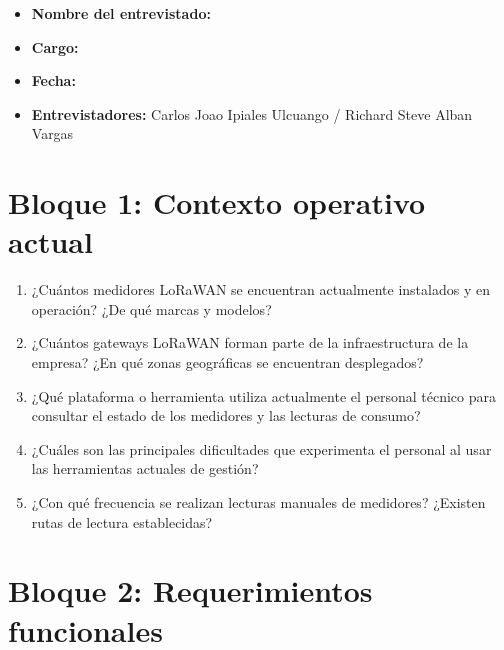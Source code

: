 \documentclass[12pt,a4paper,oneside]{report}
\begin{document}
\begin{itemize}
  \item \textbf{Nombre del entrevistado:} \underline{\hspace{6cm}}
  \item \textbf{Cargo:} \underline{\hspace{6cm}}
  \item \textbf{Fecha:} \underline{\hspace{4cm}}
  \item \textbf{Entrevistadores:} Carlos Joao Ipiales Ulcuango / Richard Steve Alban Vargas
\end{itemize}

\section*{Bloque 1: Contexto operativo actual}

\begin{enumerate}
  \item ¿Cuántos medidores LoRaWAN se encuentran actualmente instalados y en operación? ¿De qué marcas y modelos?
  \item ¿Cuántos gateways LoRaWAN forman parte de la infraestructura de la empresa? ¿En qué zonas geográficas se encuentran desplegados?
  \item ¿Qué plataforma o herramienta utiliza actualmente el personal técnico para consultar el estado de los medidores y las lecturas de consumo?
  \item ¿Cuáles son las principales dificultades que experimenta el personal al usar las herramientas actuales de gestión?
  \item ¿Con qué frecuencia se realizan lecturas manuales de medidores? ¿Existen rutas de lectura establecidas?
\end{enumerate}

\section*{Bloque 2: Requerimientos funcionales}
\end{document}
